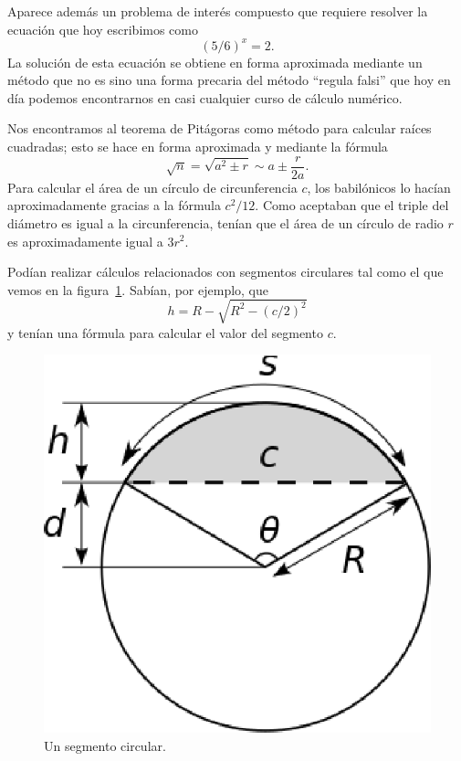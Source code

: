 Aparece además un problema de interés compuesto que requiere resolver la
ecuación que hoy escribimos como
\[
	(5/6)^x=2.
\]
La solución de esta ecuación se obtiene en forma aproximada mediante un método
que no es sino una forma precaria del método ``regula falsi'' que hoy en día
podemos encontrarnos en casi cualquier curso de cálculo numérico.

Nos encontramos al teorema de Pitágoras como método para calcular raíces
cuadradas; esto se hace en forma aproximada y mediante la fórmula
\[
	\sqrt{n}=\sqrt{a^2\pm r}\sim a\pm \frac{r}{2a}.
\]
Para calcular el área de un círculo de circunferencia $c$, los babilónicos lo
hacían aproximadamente gracias a la fórmula $c^2/12$.  Como aceptaban que el
triple del diámetro es igual a la circunferencia, tenían que el área de un
círculo de radio $r$ es aproximadamente igual a $3r^2$. 

Podían realizar cálculos relacionados con segmentos circulares tal como el que
vemos en la figura~\ref{fig:circular}. Sabían, por ejemplo, que
\[
	h=R-\sqrt{R^2-(c/2)^2}
\]
y tenían una fórmula para calcular el valor del segmento $c$.  

\begin{figure}
   \centering
   \includegraphics[scale=0.4]{images/circular}
   \caption{Un segmento circular.}
   \label{fig:circular}
\end{figure}

